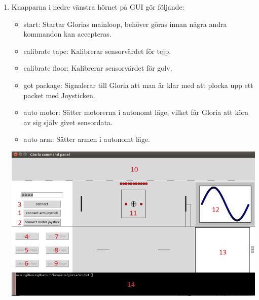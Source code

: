 \begin{enumerate}
\begin{itemize}
	\end{itemize}
	\item Knapparna i nedre vänstra hörnet på GUI gör följande:
	\begin{itemize}
		\item start: Startar Glorias mainloop, behöver göras innan några andra kommandon kan accepteras.
		\item calibrate tape: Kalibrerar sensorvärdet för tejp.
		\item calibrate floor: Kalibrerar sensorvärdet för golv.
		\item got package: Signalerar till Gloria att man är klar med att plocka upp ett packet med Joysticken.
		\item auto motor: Sätter motorerna i autonomt läge, vilket får Gloria att köra av sig själv givet sensordata.
		\item auto arm: Sätter armen i autonomt läge.
	\end{itemize}
	\includegraphics[scale=0.6]{Gui.png}
\end{enumerate}